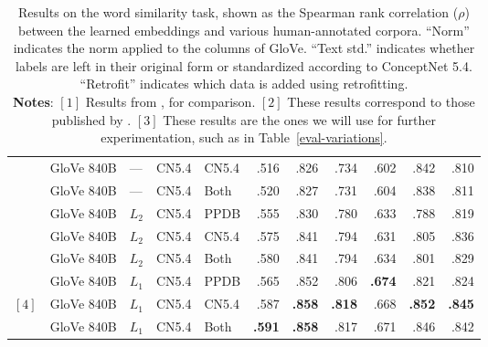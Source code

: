\documentclass[letterpaper]{article}
\begin{document}
\begin{table*}[t]
\begin{tabular}{lllllrrrrrr}
     &GloVe 840B   & ---   & CN5.4     & CN5.4    &     .516 &     .826 &      .734 &      .602 &     .842 &     .810 \\
     &GloVe 840B   & ---   & CN5.4     & Both     &     .520 &     .827 &      .731 &      .604 &     .838 &     .811 \\
     &GloVe 840B   & $L_2$ & CN5.4     & PPDB     &     .555 &     .830 &      .780 &      .633 &     .788 &     .819 \\
     &GloVe 840B   & $L_2$ & CN5.4     & CN5.4    &     .575 &     .841 &      .794 &      .631 &     .805 &     .836 \\
     &GloVe 840B   & $L_2$ & CN5.4     & Both     &     .580 &     .841 &      .794 &      .634 &     .801 &     .829 \\
     &GloVe 840B   & $L_1$ & CN5.4     & PPDB     &     .565 &     .852 &      .806 & {\bf .674}&     .821 &     .824 \\
$[4]$&GloVe 840B   & $L_1$ & CN5.4     & CN5.4    &     .587 &{\bf .858}& {\bf .818}&      .668 &{\bf .852}&{\bf .845}\\
     &GloVe 840B   & $L_1$ & CN5.4     & Both     &{\bf .591}&{\bf .858}&      .817 &      .671 &     .846 &     .842 \\
\bottomrule
\end{tabular}

\caption{
    Results on the word similarity task, shown as the Spearman rank correlation
    ($\rho$) between the learned embeddings and various human-annotated corpora.
    ``Norm'' indicates the norm applied to the columns of GloVe.
    ``Text std.'' indicates whether labels are left in their original form or
    standardized according to ConceptNet 5.4. ``Retrofit'' indicates which data
    is added using retrofitting.\\
    {\bf Notes}: $[1]$ Results from , for comparison. $[2]$ These results correspond to those published by .
    $[3]$ These results are the ones we will use for further experimentation, such as in Table~\ref{eval-variations}.
}
\label{eval-retro-standardize}
\end{table*}
\end{document}
